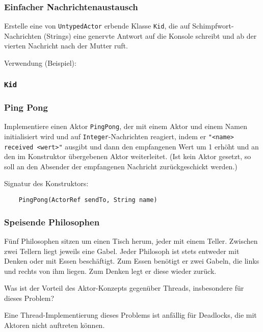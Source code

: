 \documentclass{beamer}
\date{2017-02-06/07}
\begin{document}
\normalsize
\normalem

\lstset{language=Java}

\begin{frame}[plain]
  \titlepage
\end{frame}

\begin{frame}
  \frametitle{Einfacher Nachrichtenaustausch}
  Erstelle eine von \lstinline{UntypedActor} erbende Klasse \lstinline{Kid},
  die auf Schimpfwort-Nachrichten (Strings) eine genervte Antwort auf die Konsole schreibt
  und ab der vierten Nachricht nach der Mutter ruft.
  
  Verwendung (Beispiel):
  
\end{frame}

\begin{frame}
  \frametitle{\lstinline{Kid}}
  
\end{frame}

\begin{frame}[fragile]
  \frametitle{Ping Pong}
  Implementiere einen Aktor \lstinline{PingPong},
  der mit einem Aktor und einem Namen initialisiert wird
  und auf \lstinline{Integer}-Nachrichten reagiert,
  indem er \lstinline{"<name> received <wert>"} ausgibt
  und dann den empfangenen Wert um 1 erhöht
  und an den im Konstruktor übergebenen Aktor weiterleitet.
  (Ist kein Aktor gesetzt,
  so soll an den Absender der empfangenen Nachricht zurückgeschickt werden.)
  
  Signatur des Konstruktors:
  \begin{lstlisting}
    PingPong(ActorRef sendTo, String name)
  \end{lstlisting}
\end{frame}

\begin{frame}
  \frametitle{Speisende Philosophen}
  Fünf Philosophen sitzen um einen Tisch herum,
  jeder mit einem Teller.
  Zwischen zwei Tellern liegt jeweils eine Gabel.
  Jeder Philosoph ist stets entweder mit Denken oder mit Essen beschäftigt.
  Zum Essen benötigt er zwei Gabeln, die links und rechts von ihm liegen.
  Zum Denken legt er diese wieder zurück.
  
  Was ist der Vorteil des Aktor-Konzepts gegenüber Threads,
  insbesondere für dieses Problem?
  
  \pause
  Eine Thread-Implementierung dieses Problems ist anfällig für Deadlocks,
  die mit Aktoren nicht auftreten können.
\end{frame}
\end{document}
